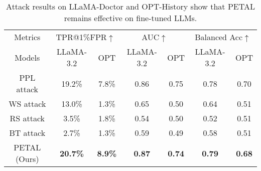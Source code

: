 \begin{table}[!t]
\footnotesize
\newcommand{\tabincell}[2]{\begin{tabular}{@{}#1@{}}#2\end{tabular}}
\centering
\setlength{\tabcolsep}{2.5pt}
\caption{Attack results on LLaMA-Doctor and OPT-History show that PETAL remains effective on fine-tuned LLMs.}
\vspace{-1mm}
\scalebox{0.96}
{
\begin{tabular}{c|cccccc}
\toprule
Metrics & \multicolumn{2}{c}{TPR@1\%FPR$\uparrow$}& \multicolumn{2}{c}{AUC$\uparrow$}& \multicolumn{2}{c}{Balanced Acc$\uparrow$}\\
\cmidrule(l{5pt}r{5pt}){2-3}\cmidrule(l{5pt}r{5pt}){4-5}\cmidrule(l{5pt}r{5pt}){6-7}
Models & LLaMA-3.2& OPT& LLaMA-3.2& OPT& LLaMA-3.2& OPT\\
\midrule
PPL attack& 19.2\%& 7.8\%& 0.86& 0.75& 0.78& 0.70\\
WS attack& 13.0\% & 1.3\%& 0.65& 0.50& 0.64& 0.51\\
RS attack& 3.5\%  & 1.8\%& 0.54& 0.50& 0.52& 0.51\\
BT attack& 2.7\%  & 1.3\%& 0.59& 0.49& 0.58& 0.51\\
PETAL (Ours)& \textbf{20.7\%}& \textbf{8.9\%}& \textbf{0.87}& \textbf{0.74}& \textbf{0.79}& \textbf{0.68}\\
\bottomrule
\end{tabular}
}
\vspace{-1em}
\label{table: fine-tuning results on chatdoctor}
\end{table}